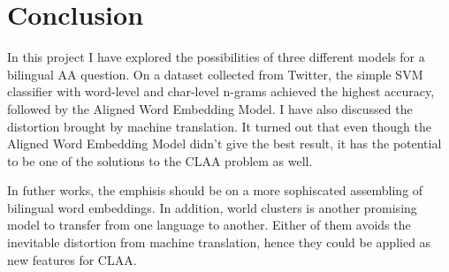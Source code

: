 \documentclass[11pt,a4paper]{article}
\begin{document}
\section{Conclusion}\label{sec:conclusion}

In this project I have explored the possibilities of three different models for a bilingual AA question. On a dataset collected from Twitter, the simple SVM classifier with word-level and char-level n-grams achieved the highest accuracy, followed by the Aligned Word Embedding Model. I have also discussed the distortion brought by machine translation. It turned out that even though the Aligned Word Embedding Model didn't give the best result, it has the potential to be one of the solutions to the CLAA problem as well.

In futher works, the emphisis should be on a more sophiscated assembling of bilingual word embeddings. In addition, world clusters \cite{tackstrom2012cross} is another promising model to transfer from one language to another. Either of them avoids the inevitable distortion from machine translation, hence they could be applied as new features for CLAA.



\end{document}
